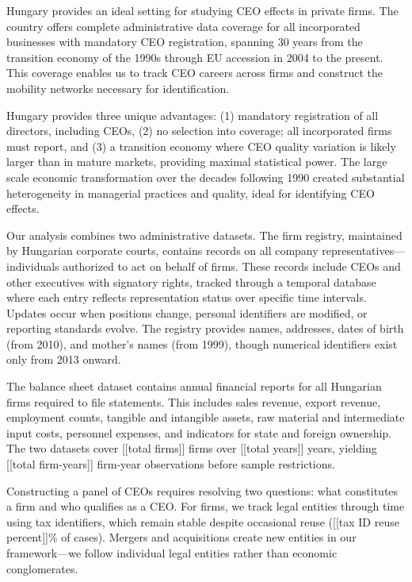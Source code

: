 \documentclass[11pt,a4paper]{article}
\begin{document}
Hungary provides an ideal setting for studying CEO effects in private firms. The country offers complete administrative data coverage for all incorporated businesses with mandatory CEO registration, spanning 30 years from the transition economy of the 1990s through EU accession in 2004 to the present. This coverage enables us to track CEO careers across firms and construct the mobility networks necessary for identification.

Hungary provides three unique advantages: (1) mandatory registration of all directors, including CEOs, (2) no selection into coverage; all incorporated firms must report, and (3) a transition economy where CEO quality variation is likely larger than in mature markets, providing maximal statistical power. The large scale economic transformation over the decades following 1990 created substantial heterogeneity in managerial practices and quality, ideal for identifying CEO effects.

Our analysis combines two administrative datasets. The firm registry, maintained by Hungarian corporate courts, contains records on all company representatives—individuals authorized to act on behalf of firms. These records include CEOs and other executives with signatory rights, tracked through a temporal database where each entry reflects representation status over specific time intervals. Updates occur when positions change, personal identifiers are modified, or reporting standards evolve. The registry provides names, addresses, dates of birth (from 2010), and mother's names (from 1999), though numerical identifiers exist only from 2013 onward.

The balance sheet dataset contains annual financial reports for all Hungarian firms required to file statements. This includes sales revenue, export revenue, employment counts, tangible and intangible assets, raw material and intermediate input costs, personnel expenses, and indicators for state and foreign ownership. The two datasets cover [[total firms]] firms over [[total years]] years, yielding [[total firm-years]] firm-year observations before sample restrictions.

Constructing a panel of CEOs requires resolving two questions: what constitutes a firm and who qualifies as a CEO. For firms, we track legal entities through time using tax identifiers, which remain stable despite occasional reuse ([[tax ID reuse percent]]\% of cases). Mergers and acquisitions create new entities in our framework—we follow individual legal entities rather than economic conglomerates.
\end{document}
